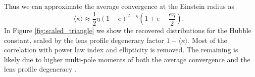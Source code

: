 Thus we can approximate the average convergence at the Einstein radius as 
\begin{equation}
\langle \kappa \rangle \approx \frac{1}{2} \eta  (1 - e)^{2 - \eta} \left(1 +  e - \frac{e \eta }{2}\right).
\end{equation}
In Figure \ref{fig:scaled_triangle} we show the recovered distributions for the Hubble constant, scaled by the lens profile degeneracy factor $1 - \langle \kappa \rangle$. Most of the correlation with power law index and ellipticity is removed. The remaining is likely due to higher multi-pole moments of both the average convergence and the lens profile degeneracy \citep{Kochanek02}. 